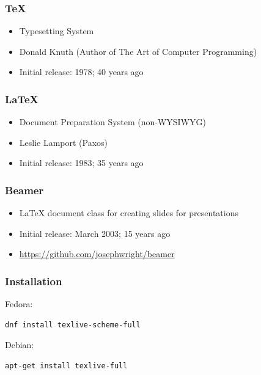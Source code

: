 \documentclass[aspectratio=169]{beamer}
\begin{document}
\begin{frame}
  \frametitle{\TeX}

  \begin{itemize}
    \item<1-> Typesetting System
  \item<2-> Donald Knuth (Author of The Art of Computer Programming)
  \item<3-> Initial release: 1978; 40 years ago

  \end{itemize}

\end{frame}

\begin{frame}
  \frametitle{\LaTeX}

  \begin{itemize}
  \item<1-> Document Preparation System (non-WYSIWYG)
  \item<2-> Leslie Lamport (Paxos)
  \item<3-> Initial release: 1983; 35 years ago
  \end{itemize}

\end{frame}

\begin{frame}
  \frametitle{Beamer}

  \begin{itemize}
  \item<1-> LaTeX document class for creating slides for presentations
  \item<2-> Initial release: March 2003; 15 years ago
  \item<3-> \url{https://github.com/josephwright/beamer}
  \end{itemize}

\end{frame}


\begin{frame}[fragile]
  \frametitle{Installation}

  Fedora:

  \begin{Verbatim}[fontsize=\small]
    dnf install texlive-scheme-full
  \end{Verbatim}

  Debian:

  \begin{Verbatim}[fontsize=\small]
    apt-get install texlive-full
  \end{Verbatim}

\end{frame}
\end{document}
